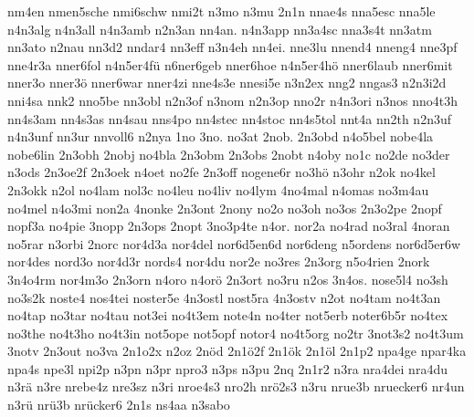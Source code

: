 {    nm4en
    nmen5sche
    nmi6schw
    nmi2t
    n3mo
    n3mu
    2n1n
    nnae4s
    nna5esc
    nna5le
    n4n3alg
    n4n3all
    n4n3amb
    n2n3an
    nn4an.
    n4n3app
    nn3a4sc
    nna3s4t
    nn3atm
    nn3ato
    n2nau
    nn3d2
    nndar4
    nn3eff
    n3n4eh
    nn4ei.
    nne3lu
    nnend4
    nneng4
    nne3pf
    nne4r3a
    nner6fol
    n4n5er4fü
    n6ner6geb
    nner6hoe
    n4n5er4hö
    nner6laub
    nner6mit
    nner3o
    nner3ö
    nner6war
    nner4zi
    nne4s3e
    nnesi5e
    n3n2ex
    nng2
    nngas3
    n2n3i2d
    nni4sa
    nnk2
    nno5be
    nn3obl
    n2n3of
    n3nom
    n2n3op
    nno2r
    n4n3ori
    n3nos
    nno4t3h
    nn4s3am
    nn4s3as
    nn4sau
    nns4po
    nn4stec
    nn4stoc
    nn4s5tol
    nnt4a
    nn2th
    n2n3uf
    n4n3unf
    nn3ur
    nnvoll6
    n2nya
    1no
    3no.
    no3at
    2nob.
    2n3obd
    n4o5bel
    nobe4la
    nobe6lin
    2n3obh
    2nobj
    no4bla
    2n3obm
    2n3obs
    2nobt
    n4oby
    no1c
    no2de
    no3der
    n3ods
    2n3oe2f
    2n3oek
    n4oet
    no2fe
    2n3off
    nogene6r
    no3hö
    n3ohr
    n2ok
    no4kel
    2n3okk
    n2ol
    no4lam
    nol3c
    no4leu
    no4liv
    no4lym
    4no4mal
    n4omas
    no3m4au
    no4mel
    n4o3mi
    non2a
    4nonke
    2n3ont
    2nony
    no2o
    no3oh
    no3os
    2n3o2pe
    2nopf
    nopf3a
    no4pie
    3nopp
    2n3ops
    2nopt
    3no3p4te
    n4or.
    nor2a
    no4rad
    no3ral
    4noran
    no5rar
    n3orbi
    2norc
    nor4d3a
    nor4del
    nor6d5en6d
    nor6deng
    n5ordens
    nor6d5er6w
    nor4des
    nord3o
    nor4d3r
    nords4
    nor4du
    nor2e
    no3res
    2n3org
    n5o4rien
    2nork
    3n4o4rm
    nor4m3o
    2n3orn
    n4oro
    n4orö
    2n3ort
    no3ru
    n2os
    3n4os.
    nose5l4
    no3sh
    no3s2k
    noste4
    nos4tei
    noster5e
    4n3ostl
    nost5ra
    4n3ostv
    n2ot
    no4tam
    no4t3an
    no4tap
    no3tar
    no4tau
    not3ei
    no4t3em
    note4n
    no4ter
    not5erb
    noter6b5r
    no4tex
    no3the
    no4t3ho
    no4t3in
    not5ope
    not5opf
    notor4
    no4t5org
    no2tr
    3not3s2
    no4t3um
    3notv
    2n3out
    no3va
    2n1o2x
    n2oz
    2nöd
    2n1ö2f
    2n1ök
    2n1öl
    2n1p2
    npa4ge
    npar4ka
    npa4s
    npe3l
    npi2p
    n3pn
    n3pr
    npro3
    n3ps
    n3pu
    2nq
    2n1r2
    n3ra
    nra4dei
    nra4du
    n3rä
    n3re
    nrebe4z
    nre3sz
    n3ri
    nroe4s3
    nro2h
    nrö2s3
    n3ru
    nrue3b
    nruecker6
    nr4un
    n3rü
    nrü3b
    nrücker6
    2n1s
    ns4aa
    n3sabo
}
